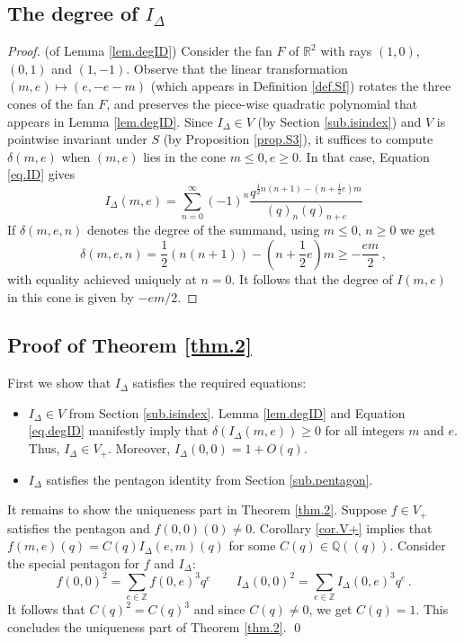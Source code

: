 \documentclass[12pt]{amsart}
\theoremstyle{definition}
\def\BZ{\mathbb Z}
\def\BQ{\mathbb Q}
\def\BR{\mathbb R}
\def\d{\delta}
\def\ID{I_{\Delta}}
\numberwithin{equation}{section}
\begin{document}
\subsection{The degree of $\ID$}
\label{sub.degDI}

\begin{proof}(of Lemma \ref{lem.degID})
Consider the fan $F$ of $\BR^2$ with rays $(1,0)$, $(0,1)$ and $(1,-1)$.
Observe that the linear transformation $(m,e)\mapsto(e,-e-m)$ (which
appears in Definition \ref{def.Sf}) rotates the three cones of the fan
$F$, and preserves the piece-wise quadratic polynomial that appears in
Lemma \ref{lem.degID}. Since $\ID \in V$ (by Section \ref{sub.isindex}) 
and $V$ is pointwise invariant under $S$ (by Proposition \ref{prop.S3}), 
it suffices to compute $\d(m,e)$ when $(m,e)$ lies in the cone 
$m \leq 0, e \geq 0$. In that case, Equation \eqref{eq.ID} gives
$$
\ID(m,e)=\sum_{n=0}^\infty (-1)^n \frac{q^{\frac{1}{2}n(n+1)
-\left(n+\frac{1}{2}e\right)m}}{(q)_n(q)_{n+e}}
$$
If $\d(m,e,n)$ denotes the degree of the summand, using $m \leq 0$, $n \geq 0$
we get
$$
\d(m,e,n)=\frac{1}{2}\left(n(n+1)\right) -\left(n+\frac{1}{2}e\right)m 
\geq -\frac{em}{2}\,,
$$
with equality achieved uniquely at $n=0$. It follows that the degree of
$I(m,e)$ in this cone is given by $-em/2$. 
\end{proof}



\subsection{Proof of Theorem \ref{thm.2}}
\label{sub.thm.2}

First we show that $\ID$ satisfies the required equations: 
\begin{itemize}
\item[(a)] $\ID \in V$ from Section \ref{sub.isindex}. Lemma \ref{lem.degID}
and Equation \eqref{eq.degID} manifestly imply that
$\d(\ID(m,e)) \geq 0$ for all integers $m$ and $e$. Thus, $\ID \in V_+$.
Moreover, $\ID(0,0)=1+O(q)$.
\item[(b)]
$\ID$ satisfies the pentagon identity from Section 
\ref{sub.pentagon}.
\end{itemize}

It remains to show the uniqueness part in Theorem \ref{thm.2}. Suppose
$f \in V_+$ satisfies the pentagon and $f(0,0)(0) \neq 0$. Corollary
\ref{cor.V+} implies that $f(m,e)(q)=C(q)\ID(e,m)(q)$ for some $C(q)
\in \BQ((q))$. 
Consider the special pentagon for $f$ and $\ID$:
$$
f(0,0)^2=\sum_{e \in \BZ} f(0,e)^3 q^e 
\qquad \ID(0,0)^2=\sum_{e \in \BZ} \ID(0,e)^3 q^e
\,.
$$
It follows that $C(q)^2=C(q)^3$ and since $C(q) \neq 0$, we get $C(q)=1$.
This concludes the uniqueness part of Theorem \ref{thm.2}.
\qed
\end{document}
